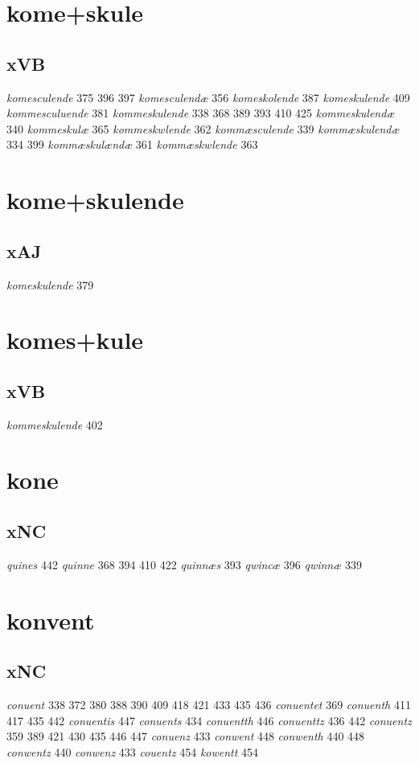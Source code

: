 \documentclass[a4paper,twocolumn]{article}
\begin{document}
\section{kome+skule}
\label{sec:orgdfe9fae}
\subsection{xVB}
\label{sec:orge3e2d24}
\emph{komesculende} 375 396 397 \emph{komesculendæ} 356 \emph{komeskolende} 387 \emph{komeskulende} 409 \emph{kommesculuende} 381 \emph{kommeskulende} 338 368 389 393 410 425 \emph{kommeskulendæ} 340 \emph{kommeskulæ} 365 \emph{kommeskwlende} 362 \emph{kommæsculende} 339 \emph{kommæskulendæ} 334 399 \emph{kommæskulændæ} 361 \emph{kommæskwlende} 363 
\section{kome+skulende}
\label{sec:org50399b7}
\subsection{xAJ}
\label{sec:orge28aa64}
\emph{komeskulende} 379 
\section{komes+kule}
\label{sec:orga596f86}
\subsection{xVB}
\label{sec:orgc1c3341}
\emph{kommeskulende} 402 
\section{kone}
\label{sec:org6698b25}
\subsection{xNC}
\label{sec:orgfaa3b3b}
\emph{quines} 442 \emph{quinne} 368 394 410 422 \emph{quinnæs} 393 \emph{qwincæ} 396 \emph{qwinnæ} 339 
\section{konvent}
\label{sec:org062491d}
\subsection{xNC}
\label{sec:orgafee335}
\emph{conuent} 338 372 380 388 390 409 418 421 433 435 436 \emph{conuentet} 369 \emph{conuenth} 411 417 435 442 \emph{conuentis} 447 \emph{conuents} 434 \emph{conuentth} 446 \emph{conuenttz} 436 442 \emph{conuentz} 359 389 421 430 435 446 447 \emph{conuenz} 433 \emph{conwent} 448 \emph{conwenth} 440 448 \emph{conwentz} 440 \emph{conwenz} 433 \emph{couentz} 454 \emph{kowentt} 454 
\end{document}
